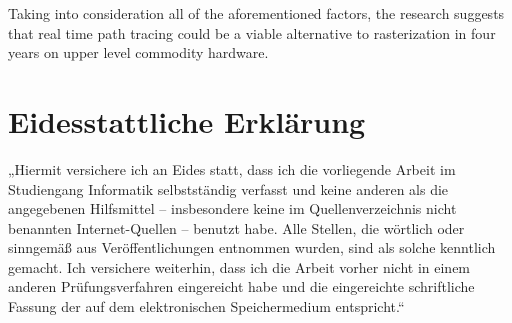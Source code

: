 \documentclass[
  twoside,
  11pt, a4paper,
  footinclude=true,
  headinclude=true,
  cleardoublepage=empty
]{scrreprt}
\begin{document}
Taking into consideration all of the aforementioned factors,
the research suggests that real time path tracing could be a viable alternative to
rasterization in four years on upper level commodity hardware.
\listoffigures
\listoflistings
\listoftables
\printbibliography
% 
% 

\chapter*{Eidesstattliche Erklärung}
\onehalfspace
„Hiermit versichere ich an Eides statt, dass ich die vorliegende Arbeit im
Studiengang Informatik selbstständig verfasst und keine anderen als die
angegebenen Hilfsmittel – insbesondere keine im Quellenverzeichnis nicht
benannten Internet-Quellen – benutzt habe. Alle Stellen, die wörtlich oder
sinngemäß aus Veröffentlichungen entnommen wurden, sind als solche kenntlich
gemacht. Ich versichere weiterhin, dass ich die Arbeit vorher nicht in einem
anderen Prüfungsverfahren eingereicht habe und die eingereichte schriftliche
Fassung der auf dem elektronischen Speichermedium entspricht.“
\singlespace
\end{document}
